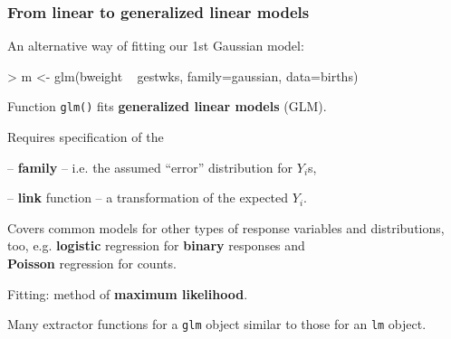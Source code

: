 \documentclass[12pt,dvipsnames,t,handout%
,aspectratio=169%
]{beamer}
\begin{document}
\begin{frame}[fragile]
\frametitle{From linear to generalized linear models}

\bi
\item An alternative way of fitting our 1st Gaussian model:
\medskip
{\small
\begin{semiverbatim}
> m <- glm(bweight ~ gestwks, family=gaussian, data=births)
\end{semiverbatim}
}
\medskip
\item
Function \texttt{glm()} fits {\bf generalized linear models} (GLM).
\medskip
\item
Requires specification of the  
\bi
{\normalsize
\item[--] {\bf family} 
-- i.e. the assumed ``error'' distribution for $Y_i$s, %
\item[--]
{\bf link} function -- a transformation of the expected $Y_i$.
}
\ei
\item
Covers common models for other types
of response variables and distributions, too, e.g.
{\bf logistic} regression for \textbf{binary} responses and \\ {\bf Poisson} regression
for counts.
\medskip
\item
Fitting: method of {\bf maximum likelihood}.  
\item
Many extractor functions
for a {\tt glm} object similar to those 
 for an {\tt lm} object.

\ei

\end{frame}
\end{document}

